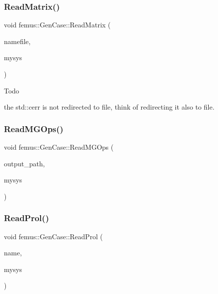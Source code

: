 \subsubsection{\texorpdfstring{Read\+Matrix()}{ReadMatrix()}}
{\footnotesize\ttfamily void femus\+::\+Gen\+Case\+::\+Read\+Matrix (\begin{DoxyParamCaption}\item[{const std\+::string \&}]{namefile,  }\item[{\mbox{\hyperlink{classfemus_1_1_system_two}{System\+Two}} $\ast$}]{mysys }\end{DoxyParamCaption})\hspace{0.3cm}{\ttfamily [static]}}

\begin{DoxyRefDesc}{Todo}
\item[\mbox{\hyperlink{todo__todo000013}{Todo}}]the std\+::cerr is not redirected to file, think of redirecting it also to file. \end{DoxyRefDesc}
\mbox{\label{classfemus_1_1_gen_case_a8ff0e1ca8e4b16e005e8a37799c43194}} 
\subsubsection{\texorpdfstring{Read\+M\+G\+Ops()}{ReadMGOps()}}
{\footnotesize\ttfamily void femus\+::\+Gen\+Case\+::\+Read\+M\+G\+Ops (\begin{DoxyParamCaption}\item[{const std\+::string}]{output\+\_\+path,  }\item[{\mbox{\hyperlink{classfemus_1_1_system_two}{System\+Two}} $\ast$}]{mysys }\end{DoxyParamCaption})\hspace{0.3cm}{\ttfamily [static]}}

\mbox{\label{classfemus_1_1_gen_case_a537015fb25eb05e896a2ab4da02d4c9f}} 
\subsubsection{\texorpdfstring{Read\+Prol()}{ReadProl()}}
{\footnotesize\ttfamily void femus\+::\+Gen\+Case\+::\+Read\+Prol (\begin{DoxyParamCaption}\item[{const std\+::string \&}]{name,  }\item[{\mbox{\hyperlink{classfemus_1_1_system_two}{System\+Two}} $\ast$}]{mysys }\end{DoxyParamCaption})\hspace{0.3cm}{\ttfamily [static]}}

